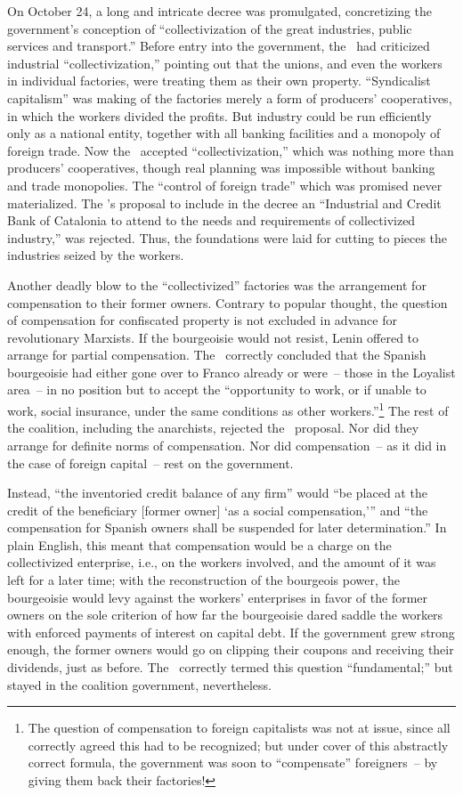 On October 24, a long and intricate decree was promulgated, concretizing the government’s conception of ``collectivization of the great industries, public services and transport.'' Before entry into the government, the \POUM\ had criticized industrial ``col\-lec\-ti\-vi\-za\-tion,'' pointing out that the unions, and even the workers in individual factories, were treating them as their own property. ``Syndicalist capitalism'' was making of the factories merely a form of producers’ cooperatives, in which the workers divided the profits. But industry could be run efficiently only as a national entity, together with all banking facilities and a monopoly of foreign trade. Now the \POUM\ accepted ``collectivization,'' which was nothing more than producers’ cooperatives, though real planning was impossible without banking and trade monopolies. The ``control of foreign trade'' which was promised never materialized. The \POUM’s proposal to include in the decree an ``Industrial and Credit Bank of Catalonia to attend to the needs and requirements of collectivized industry,'' was rejected. Thus, the foundations were laid for cutting to pieces the industries seized by the workers.

Another deadly blow to the ``collectivized'' factories was the arrangement for compensation to their former owners. Contrary to popular thought, the question of compensation for confiscated property is not excluded in advance for revolutionary Marxists. If the bourgeoisie would not resist, Lenin offered to arrange for partial compensation. The \POUM\ correctly concluded that the Spanish bourgeoisie had either gone over to Franco already or were~-- those in the Loyalist area~-- in no position but to accept the ``opportunity to work, or if unable to work, social insurance, under the same conditions as other workers.''\kp\footnote{The question of compensation to foreign capitalists was not at issue, since all correctly agreed this had to be recognized; but under cover of this abstractly correct formula, the government was soon to ``compensate'' foreigners~-- by giving them back their factories!} The rest of the coalition, including the anarchists, rejected the \POUM\ proposal. Nor did they arrange for definite norms of compensation. Nor did compensation~-- as it did in the case of foreign capital~-- rest on the government.

Instead, ``the inventoried credit balance of any firm'' would ``be placed at the credit of the beneficiary [former owner] `as a social compensation,'\kp\kp'' and ``the compensation for Spanish owners shall be suspended for later determination.'' In plain English, this meant that compensation would be a charge on the collectivized enterprise, i.e., on the workers involved, and the amount of it was left for a later time; with the reconstruction of the bourgeois power, the bourgeoisie would levy against the workers’ enterprises in favor of the former owners on the sole criterion of how far the bourgeoisie dared saddle the workers with enforced payments of interest on capital debt. If the government grew strong enough, the former owners would go on clipping their coupons and receiving their dividends, just as before. The \POUM\ correctly termed this question ``fundamental;'' but stayed in the coalition government, nevertheless.

